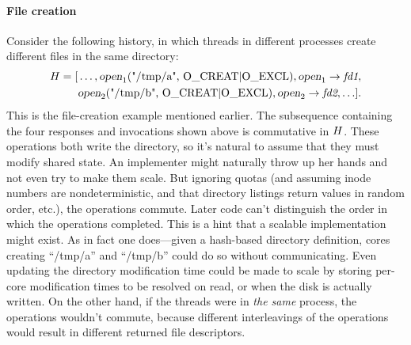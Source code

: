 \begin{comment}
Careful analysis using our commutativity definition reveals that
increments and decrements commute as long as the counter is large
enough. If the counter is small, however, decrements may not commute.
For example, if the counter is one, and there are two concurrent
decrements, which one returns true and which false depends on
the order. Thus this interface does not allow a generally commutative
implementation.

However, the commutativity analysis suggests a way to change the
interface so that it can scale. In particular:
\begin{verbatim}
  inc() -> void
  dec() -> void
  nonzero?() -> boolean
\end{verbatim}
Now increments and decrements scale. If the calls to {\tt nonzero?}
can be moved to a background thread that occasionally collects
garbage, then the common case can be made to scale.

\XXX[rtm][this is a lot like the ispos example, but cast in a way
that I think makes it more clear why it's useful to the programmer to
have a precise definition of commutativity. also I think we should have
an example that involves a programming using commutativity to help
choose a better interface.]
\end{comment}


\paragraph{File creation}  Consider the following history, in which
threads in different processes create different files in the same directory:
%
\begin{align*}
\HIST{H} = [& \ldots, \INV{open}{\text{\code{"/tmp/a", O_CREAT|O_EXCL}}}{1},
    \RES{open}{\textit{fd1}}{1}, \\
  & \INV{open}{\text{\code{"/tmp/b", O_CREAT|O_EXCL}}}{2},
    \RES{open}{\textit{fd2}}{2}, \ldots ].
\end{align*}
%
This is the file-creation example mentioned earlier.
%
The subsequence containing the four responses and invocations shown
above is commutative in $H$.
%
These operations both write
the directory, so it's natural to assume that they must modify shared
state. An implementer might naturally throw up her hands and not even
try to make them scale. But ignoring quotas (and assuming inode
numbers are nondeterministic, and that directory listings return values
in random order, etc.), the operations commute. Later code
can't distinguish the order in which the operations completed. This is
a hint that a scalable implementation might exist. As in fact one
does---given a hash-based directory definition, cores creating
``/tmp/a'' and ``/tmp/b'' could do so without
communicating. Even updating the directory modification time could be
made to scale by storing per-core modification times to be resolved on
read, or when the disk is actually written.
%
On the other hand, if the threads were in \emph{the same} process, the
operations wouldn't commute, because different interleavings of the
operations would result in different returned file descriptors.


